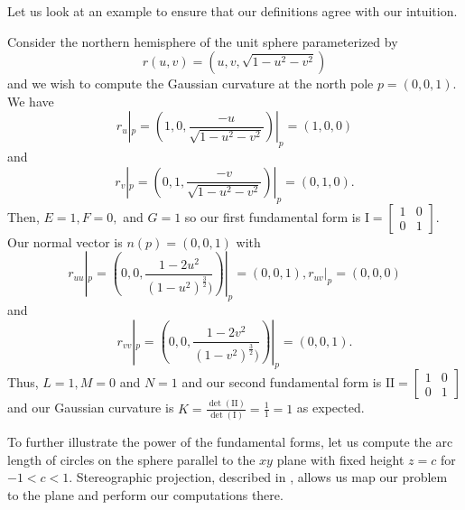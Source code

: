 Let us look at an example to ensure that our definitions agree with our intuition.
\begin{example}\label{ex:compute-surface-curvature}
Consider the northern hemisphere of the unit sphere parameterized
by $$r(u,v)=(u,v,\sqrt{1-u^2-v^2})$$ and we wish to compute the Gaussian curvature at
the north pole $p=(0,0,1)$.
We have $$r_u|_p=(1,0,\frac{-u}{\sqrt{1-u^2-v^2}})|_p=(1,0,0)$$ and
$$r_v|_p=(0,1,\frac{-v}{\sqrt{1-u^2-v^2}})|_p=(0,1,0).$$
Then, $E=1, F=0,$ and $G=1$ so our first fundamental form is
$\mathrm{I}=\begin{bmatrix}
1 & 0 \\
0 & 1 
\end{bmatrix}.$
Our normal vector is $n(p)=(0,0,1)$ with 
$$r_{uu}|_p=(0,0,\frac{1-2u^2}{(1-u^2)^{\frac{3}{2}})})|_p=(0,0,1),
r_{uv}|_p=(0,0,0)$$ and 
$$r_{vv}|_p=(0,0,\frac{1-2v^2}{(1-v^2)^{\frac{3}{2}})})|_p=(0,0,1).$$
Thus, $L=1, M=0$ and $N=1$ and our second fundamental form is
$\mathrm{I\!I}=\begin{bmatrix}
1 & 0 \\
0 & 1 
\end{bmatrix}$
and our Gaussian curvature is $K=\frac{\det(\mathrm{I\!I})}{\det(\mathrm{I})}=\frac{1}{1}=1$ as expected.

\end{example}

To further illustrate the power of the fundamental forms, let us
compute
the arc length of circles on the sphere parallel 
to the $xy$ plane with fixed height $z=c$ for $-1<c<1$.
Stereographic projection, described in ,
allows us map our problem to the plane and perform our computations there.

